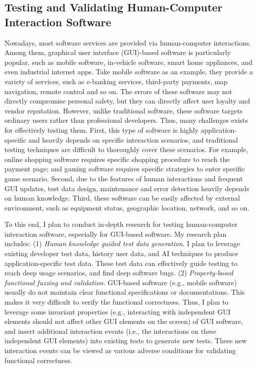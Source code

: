 \documentclass[a4paper]{article}
\begin{document}
\subsection{Testing and Validating Human-Computer Interaction Software}

Nowadays, most software services are provided via human-computer interactions. Among them, graphical user interface (GUI)-based software is particularly popular, such as mobile software, in-vehicle software, smart home appliances, and even industrial internet apps. Take mobile software as an example, they provide a variety of services, such as e-banking services, third-party payments, map navigation, remote control and so on. The errors of these software may not directly compromise personal safety, but they can directly affect user loyalty and vendor reputation. However, unlike traditional software, these software targets ordinary users rather than professional developers. Thus, many challenges exists for effectively testing them. First, this type of software is highly application-specific and heavily depends on specific interaction scenarios, and traditional testing techniques are difficult to thoroughly cover these scenarios. For example, online shopping software requires specific shopping procedure to reach the payment page; and gaming software requires specific strategies to enter specific game scenario. 
Second, due to the features of human interactions and frequent GUI updates, test data design, maintenance and error detection heavily depends on human knowledge.
Third, these software can be easily affected by external environment, such as equipment status, geographic location, network, and so on.

To this end, I plan to conduct in-depth research for testing human-computer interaction software, especially for GUI-based software. My research plan includes: 
(1) \emph{Human knowledge guided test data generation}.
I plan to leverage existing developer test data, history user data, and AI techniques to produce application-specific test data. 
These test data can effectively guide testing to reach deep usage scenarios, and find
deep software bugs.
(2) \emph{Property-based functional fuzzing and validation}.
GUI-based software (e.g., mobile software) usually do not maintain clear functional specifications or documentations. 
This makes it very difficult to verify the functional correctness.
Thus, I plan to leverage some invariant properties (e.g., interacting with independent GUI elements should not affect other GUI elements on the screen) of GUI software, and insert additional interaction events (i.e., the interactions on these independent GUI elements) into existing tests to generate new tests. These new interaction events can be viewed as various adverse conditions for validating functional correctness.
\end{document}
